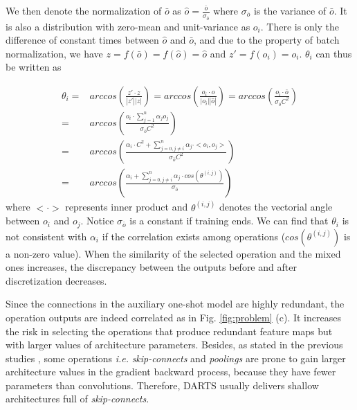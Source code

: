 \documentclass[journal]{IEEEtran}
\begin{document}
We then denote the normalization of $\bar{o}$ as $\hat{o}=\frac{\bar{o}}{\sigma_{\bar{o}}}$ where $\sigma_{\bar{o}}$ is the variance of $\bar{o}$. It is also a distribution with zero-mean and unit-variance as $o_i$. There is only the difference of constant times between $\hat{o}$ and $\bar{o}$, and due to the property of batch normalization, we have $z=f(\bar{o})=f(\hat{o})=\hat{o}$ and $z'=f(o_i)=o_i$. $\theta_i$ can thus be written as 


\begin{equation}
\begin{aligned}
\theta_i = &arccos(\frac{z'\cdot z}{|z'||z|}) = arccos(\frac{o_i \cdot \hat{o}}{|o_i||\hat{o}|})=arccos (\frac{o_i\cdot \bar{o}}{\sigma_{\bar{o}} C^2})\\
= &arccos(\frac{o_i\cdot \sum_{j=1}^n\alpha_j o_j}{\sigma_{\bar{o}} C^2})\\
= & arccos(\frac{\alpha_i\cdot C^2+\sum_{j=0,j\neq i}^n{\alpha_j\cdot<o_i,o_j>}}{\sigma_{\bar{o}} C^2}) \\
= & arccos(\frac{\alpha_i+\sum_{j=0,j\neq i}^n{\alpha_j\cdot cos(\theta^{(i,j)})}}{\sigma_{\bar{o}}})
\label{Formula.distance}
\end{aligned}
\end{equation}
where $<\cdot>$ represents inner product and $\theta^{(i,j)}$ denotes the vectorial angle between $o_i$ and $o_j$. Notice $\sigma_{\bar{o}}$ is a constant if training ends. We can find that $\theta_i$ is not consistent with $\alpha_i$ if the correlation exists among operations ($cos(\theta^{(i,j)})$ is a non-zero value). 
When the similarity of the selected operation and the mixed ones increases, the discrepancy between the outputs before and after discretization decreases. 

Since the connections in the auxiliary one-shot model are highly redundant, the operation outputs are indeed correlated as in Fig. \ref{fig:problem} (c). It increases the risk in selecting the operations that produce redundant feature maps but with larger values of architecture parameters. Besides, as stated in the previous studies \cite{DBLP:journals/corr/abs-1904-12760}, some operations \emph{i.e.} \textit{skip-connects} and \textit{poolings} are prone to gain larger architecture values in the gradient backward process, because they have fewer parameters than convolutions. Therefore, DARTS usually delivers shallow architectures full of \textit{skip-connects}.
\end{document}
